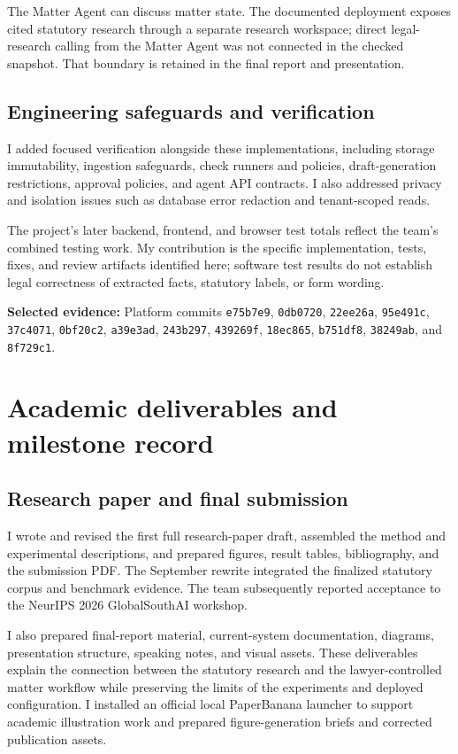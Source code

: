 \documentclass[11pt,a4paper]{article}
\newcommand{\evidence}[1]{\par{\small\textbf{Selected evidence:} #1}\par}
\newcommand{\repo}[1]{\texttt{\nolinkurl{#1}}}
\begin{document}
The Matter Agent can discuss matter state. The documented deployment exposes cited statutory research through a separate research workspace; direct legal-research calling from the Matter Agent was not connected in the checked snapshot. That boundary is retained in the final report and presentation.

\subsection{Engineering safeguards and verification}
I added focused verification alongside these implementations, including storage immutability, ingestion safeguards, check runners and policies, draft-generation restrictions, approval policies, and agent API contracts. I also addressed privacy and isolation issues such as database error redaction and tenant-scoped reads.

The project's later backend, frontend, and browser test totals reflect the team's combined testing work. My contribution is the specific implementation, tests, fixes, and review artifacts identified here; software test results do not establish legal correctness of extracted facts, statutory labels, or form wording.

\evidence{Platform commits \repo{e75b7e9}, \repo{0db0720}, \repo{22ee26a}, \repo{95e491c}, \repo{37c4071}, \repo{0bf20c2}, \repo{a39e3ad}, \repo{243b297}, \repo{439269f}, \repo{18ec865}, \repo{b751df8}, \repo{38249ab}, and \repo{8f729c1}.}

\newpage
\section{Academic deliverables and milestone record}
\subsection{Research paper and final submission}
I wrote and revised the first full research-paper draft, assembled the method and experimental descriptions, and prepared figures, result tables, bibliography, and the submission PDF. The September rewrite integrated the finalized statutory corpus and benchmark evidence. The team subsequently reported acceptance to the NeurIPS 2026 GlobalSouthAI workshop.

I also prepared final-report material, current-system documentation, diagrams, presentation structure, speaking notes, and visual assets. These deliverables explain the connection between the statutory research and the lawyer-controlled matter workflow while preserving the limits of the experiments and deployed configuration. I installed an official local PaperBanana launcher to support academic illustration work and prepared figure-generation briefs and corrected publication assets.
\end{document}
